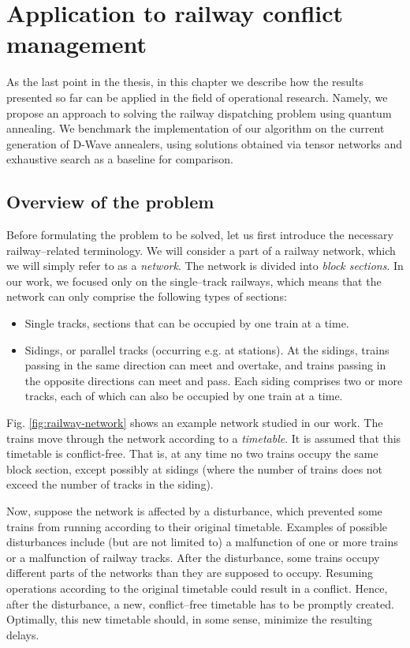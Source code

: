 \chapter{Application to railway conflict management}

As the last point in the thesis, in this chapter we describe how the results presented so far can be
applied in the field of operational research. Namely, we propose an approach to solving the railway
dispatching problem using quantum annealing. We benchmark the implementation of our algorithm on the
current generation of D-Wave annealers, using solutions obtained via tensor networks and exhaustive
search as a baseline for comparison.


\section{Overview of the problem}
Before formulating the problem to be solved, let us first introduce the necessary railway--related
terminology. We will consider a part of a railway network, which we will simply refer to as a
\emph{network}. The network is divided into \emph{block sections}. In our work, we focused only on
the single--track railways, which means that the network can only comprise the following types of
sections:
\begin{itemize}
    \item Single tracks, sections that can be occupied by one train at a time.
    \item Sidings, or parallel tracks (occurring e.g. at stations). At the sidings, trains passing in
        the same direction can meet and overtake, and trains passing in the opposite directions can
        meet and pass. Each siding comprises two or more tracks, each of which can also be occupied by
        one train at a time.
\end{itemize}

Fig. \ref{fig:railway-network} shows an example network studied in our work. The trains move through
the network according to a \emph{timetable}. It is assumed that this timetable is conflict-free.
That is, at any time no two trains occupy the same block section, except possibly at sidings (where
the number of trains does not exceed the number of tracks in the siding).

Now, suppose the network is affected by a disturbance, which prevented some trains from running
according to their original timetable. Examples of possible disturbances include (but are not
limited to) a malfunction of one or more trains or a malfunction of railway tracks.
After the disturbance, some trains occupy different parts of the networks than they are supposed to
occupy. Resuming operations according to the original timetable could result in a conflict. Hence,
after the disturbance, a new, conflict--free timetable has to be promptly created. Optimally, this
new timetable should, in some sense, minimize the resulting delays.

